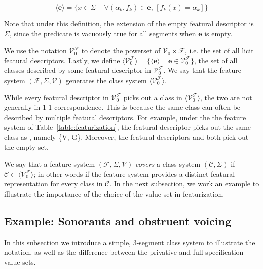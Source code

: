 \documentclass[11pt, oneside]{article}   	%
\begin{document}
$$ \big \langle \mathbf{e} \big \rangle = \{x \in \Sigma \, \mid \, \forall (\alpha_k, f_k) \in \mathbf{e} \text{,  } [ f_k(x) = \alpha_k ] \} $$

\vspace{\baselineskip} \noindent Note that under this definition, the extension of the empty featural descriptor is $\Sigma$, since the predicate is vacuously true for all segments when $\mathbf{e}$ is empty. 

We use the notation $\mathcal V_0^\mathcal F$ to denote the powerset of $\mathcal V_0 \times \mathcal F$, i.e. the set of all licit featural descriptors. Lastly, we define $\langle \mathcal V_0^\mathcal F \rangle = \{ \langle \mathbf{e} \rangle \, \mid \, \mathbf{e} \in \mathcal V_0^\mathcal F \}$, the set of all classes described by some featural descriptor in $\mathcal V_0^\mathcal F$. We say that the feature system $(\mathcal F, \Sigma, \mathcal V)$ generates the class system $\langle \mathcal V_0^\mathcal F \rangle$.

While every featural descriptor in $\mathcal V_0^\mathcal F$ picks out a class in $\langle \mathcal V_0^\mathcal F \rangle$, the two are not generally in 1-1 correspondence. This is because the same class can often be described by multiple featural descriptors. For example, under the the feature system of Table~\ref{table:featurization}, the featural descriptor  picks out the same class as , namely \{V, G\}. Moreover, the featural descriptors  and  both pick out the empty set.

\vspace{\baselineskip} We say that a feature system $(\mathcal F, \Sigma, \mathcal V)$ \textit{covers} a class system $(\mathcal C, \Sigma)$ if $\mathcal C \subset \langle \mathcal V_0^\mathcal F \rangle$; in other words if the feature system provides a distinct featural representation for every class in $\mathcal C$. In the next subsection, we work an example to illustrate the importance of the choice of the value set in featurization.

\subsection{Example: Sonorants and obstruent voicing}

In this subsection we introduce a simple, 3-segment class system to illustrate the notation, as well as the difference between the privative and full specification value sets.
\end{document}
